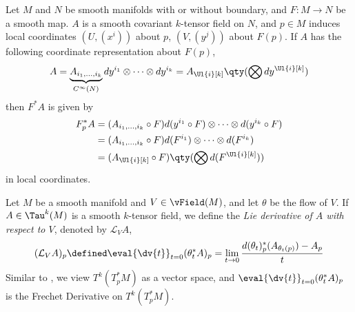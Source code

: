 \documentclass[../main-v2-manifolds.tex]{subfiles}
\begin{document}
\begin{wts}\label{tensor-field-pullback-coordinates}
    Let $M$ and $N$ be smooth manifolds with or without boundary, and $F:M\to N$ be a smooth map. $A$ is a smooth covariant $k$-tensor field on $N$, and $p\in M$ induces local coordinates $(U,(x^i))$ about $p$, $(V,(y^j))$ about $F(p)$. If $A$ has the following coordinate representation about $F(p)$,
    \begin{equation}\label{tensor-field-pullback-coordinates-eq0}
        A = \underbrace{A_{i_1,\ldots,i_k}}_{C^\infty(N)}dy^{i_1}\otimes\cdots\otimes dy^{i_k} = A_{\Ul{i}[k]}\qty(\bigotimes dy^{\Ul{i}[k]})
    \end{equation}
    then $F^*A$ is given by
    \begin{align}\label{tensor-field-pullback-coordinates-eq1}
        F^*_pA &= (A_{i_1,\ldots,i_k}\circ F)d(y^{i_1}\circ F)\otimes \cdots\otimes d(y^{i_k}\circ F)\\
        &= (A_{i_1,\ldots,i_k}\circ F)d(F^{i_1})\otimes \cdots\otimes d(F^{i_k})\\
        &= (A_{\Ul{i}[k]}\circ F)\qty(\bigotimes d(F^{\Ul{i}[k]}))
    \end{align}
    in local coordinates.
\end{wts}

\begin{definition}
    Let $M$ be a smooth manifold and $V\in\vField(M)$, and let $\theta$ be the flow of $V$. If $A\in \Tau^k(M)$ is a smooth $k$-tensor field, we define the \emph{Lie derivative of $A$ with respect to $V$}, denoted by $\mathcal{L}_V A$, 
    \begin{equation}\label{lie-derivative-eq1-tensor}
        (\mathcal{L}_VA)_p \defined\eval{\dv{t}}_{t=0}(\theta^*_tA)_p = \lim_{t\to 0}\dfrac{d(\theta_t)^*_p(A_{\theta_t(p)}) - A_p}{t}
    \end{equation}
    Similar to , we view $T^k(T^*_pM)$ as a vector space, and $\eval{\dv{t}}_{t=0}(\theta_t^*A)_p$ is the Frechet Derivative on $T^k(T^*_pM)$.
\end{definition}
\end{document}
